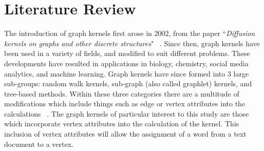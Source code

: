 %
%
%

\chapter{Literature Review}
\label{literature-review}




\hspace*{0.3cm} The introduction of graph kernels first arose in 2002, from the paper ``\textit{Diffusion kernels on graphs and other discrete structures}" ~\cite{kondor2002diffusion}. Since then, graph kernels have been used in a variety of fields, and modified to suit different problems. These developments have resulted in applications in biology, chemistry, social media analytics, and machine learning. Graph kernels have since formed into 3 large sub-groups: random walk kernels, sub-graph (also called graphlet) kernels, and tree-based methods. Within these three categories there are a multitude of modifications which include things such as edge or vertex attributes into the calculations ~\cite{vishwanathan2010graph}. The graph kernels of particular interest to this study are those which incorporate vertex attributes into the calculation of the kernel.  This inclusion of vertex attributes will allow the assignment of a word from a text document to a vertex. \\

